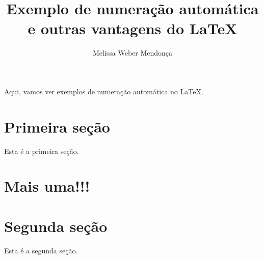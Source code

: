 \documentclass{article}
\author{Melissa Weber Mendonça}
\title{Exemplo de numeração automática\\e outras vantagens do \LaTeX}
\begin{document}
\maketitle


Aqui, vamos ver exemplos de numeração automática no \LaTeX. 

\section{Primeira seção\label{primeira}}

Esta é a primeira seção.

\section{Mais uma!!!}



\section{Segunda seção}

Esta é a segunda seção.


\end{document}
